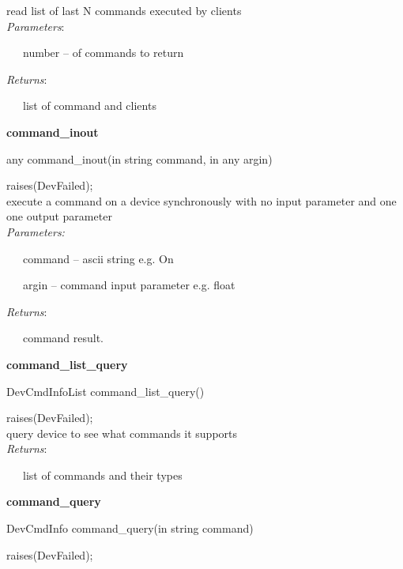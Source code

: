 read list of last N commands executed by clients\\

\emph{Parameters}:

~~~number – of commands to return

\emph{Returns}:

~~~list of command and clients\\

\begin{flushleft}
\textbf{command\_inout}
\par\end{flushleft}

any command\_inout(in string command, in any argin)

raises(DevFailed);\\

execute a command on a device synchronously with no input parameter
and one one output parameter\\

\emph{Parameters:}

~~~command – ascii string e.g. \textquotedbl{}On\textquotedbl{}

~~~argin – command input parameter e.g. float

\emph{Returns}:

~~~command result.\\

\begin{flushleft}
\textbf{command\_list\_query}
\par\end{flushleft}

DevCmdInfoList command\_list\_query()

raises(DevFailed);\\

query device to see what commands it supports\\

\emph{Returns}:

~~~list of commands and their types\\

\begin{flushleft}
\textbf{command\_query}
\par\end{flushleft}

DevCmdInfo command\_query(in string command)

raises(DevFailed);\\

